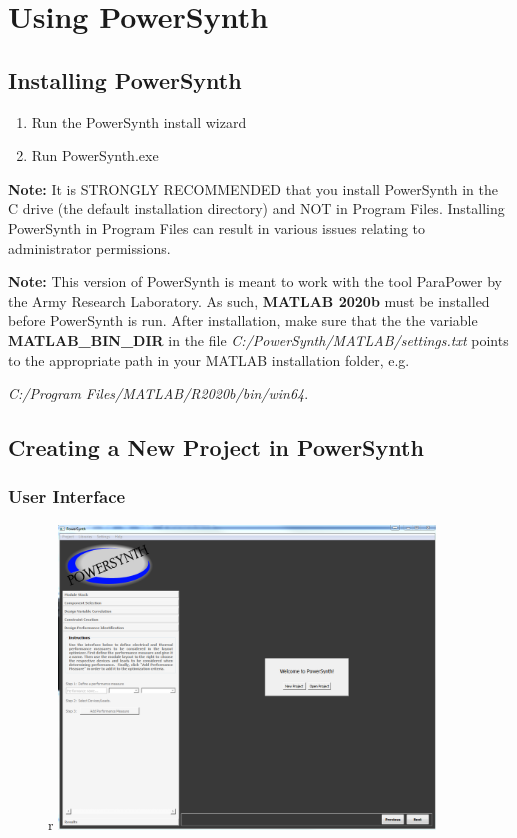 \documentclass[11pt]{article}
\begin{document}
\pagebreak

\section{Using PowerSynth}
\label{sec-2}

\subsection{Installing PowerSynth}
\label{sec-2-1}

\begin{enumerate}
\item Run the PowerSynth install wizard
\item Run PowerSynth.exe
\end{enumerate}
\par
\textbf{Note:} It is STRONGLY RECOMMENDED that you install PowerSynth in the C drive (the default installation directory) and NOT in Program Files. Installing PowerSynth in Program Files can result in various issues relating to administrator permissions.
\par
\textbf{Note:} This version of PowerSynth is meant to work with the tool ParaPower by the Army Research Laboratory. As such, \textbf{MATLAB 2020b} must be installed before PowerSynth is run. After installation, make sure that the the variable \textbf{MATLAB\_BIN\_DIR} in the file \emph{C:/PowerSynth/MATLAB/settings.txt} points to the appropriate path in your MATLAB installation folder, e.g. \par \emph{C:/Program Files/MATLAB/R2020b/bin/win64}.

\subsection{Creating a New Project in PowerSynth}
\label{sec-2-2}

\subsubsection{User Interface}
\label{sec-2-2-1}

\begin{figure}{r}
\centering
\includegraphics[width=10cm]{./figs/02_NewProj.png}
\end{figure}
\end{document}

